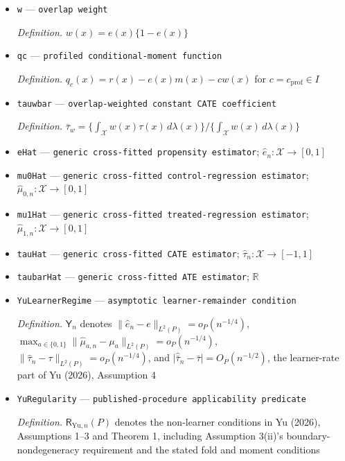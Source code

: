 \documentclass{article}
\begin{document}
\begin{itemize}
  \par\smallskip\noindent\emph{Definition.} \(r(x)=\mathbb E_P[AY\mid X=x]\)
  \item \texttt{w} --- \texttt{overlap weight}
  \par\smallskip\noindent\emph{Definition.} \(w(x)=e(x)\{1-e(x)\}\)
  \item \texttt{qc} --- \texttt{profiled conditional-\allowbreak{}moment function}
  \par\smallskip\noindent\emph{Definition.} \(q_c(x)=r(x)-e(x)m(x)-c w(x)\) for \(c=c_{\mathrm{prof}}\in I\)
  \item \texttt{tauwbar} --- \texttt{overlap-\allowbreak{}weighted constant CATE coefficient}
  \par\smallskip\noindent\emph{Definition.} \(\bar\tau_w=\{\int_{\mathcal X}w(x)\tau(x)\,d\lambda(x)\}/\{\int_{\mathcal X}w(x)\,d\lambda(x)\}\)
  \item \texttt{eHat} --- \texttt{generic cross-\allowbreak{}fitted propensity estimator}; \(\widehat e_n:\mathcal X\to[0,1]\)
  \item \texttt{mu0Hat} --- \texttt{generic cross-\allowbreak{}fitted control-\allowbreak{}regression estimator}; \(\widehat\mu_{0,n}:\mathcal X\to[0,1]\)
  \item \texttt{mu1Hat} --- \texttt{generic cross-\allowbreak{}fitted treated-\allowbreak{}regression estimator}; \(\widehat\mu_{1,n}:\mathcal X\to[0,1]\)
  \item \texttt{tauHat} --- \texttt{generic cross-\allowbreak{}fitted CATE estimator}; \(\widehat\tau_n:\mathcal X\to[-1,1]\)
  \item \texttt{taubarHat} --- \texttt{generic cross-\allowbreak{}fitted ATE estimator}; \(\mathbb R\)
  \item \texttt{YuLearnerRegime} --- \texttt{asymptotic learner-\allowbreak{}remainder condition}
  \par\smallskip\noindent\emph{Definition.} \(\mathsf Y_n\) denotes \(\|\widehat e_n-e\|_{L^2(P)}=o_P(n^{-1/4})\), \(\max_{a\in\{0,1\}}\|\widehat\mu_{a,n}-\mu_a\|_{L^2(P)}=o_P(n^{-1/4})\), \(\|\widehat\tau_n-\tau\|_{L^2(P)}=o_P(n^{-1/4})\), and \(\lvert\widehat{\bar\tau}_n-\bar\tau\rvert=O_P(n^{-1/2})\), the learner-rate part of Yu (2026), Assumption 4
  \item \texttt{YuRegularity} --- \texttt{published-\allowbreak{}procedure applicability predicate}
  \par\smallskip\noindent\emph{Definition.} \(\mathsf R_{\mathrm{Yu},n}(P)\) denotes the non-learner conditions in Yu (2026), Assumptions 1--3 and Theorem 1, including Assumption 3(ii)'s boundary-nondegeneracy requirement and the stated fold and moment conditions

\end{itemize}
\end{document}
